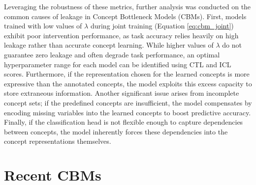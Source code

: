 Leveraging the robustness of these metrics, further analysis was conducted on the common causes of leakage in Concept Bottleneck Models (CBMs). First, models trained with low values of $\lambda$ during joint training (Equation \ref{eq:cbm_joint}) exhibit poor intervention performance, as task accuracy relies heavily on high leakage rather than accurate concept learning. While higher values of $\lambda$ do not guarantee zero leakage and often degrade task performance, an optimal hyperparameter range for each model can be identified using CTL and ICL scores. Furthermore, if the representation chosen for the learned concepts is more expressive than the annotated concepts, the model exploits this excess capacity to store extraneous information. Another significant issue arises from incomplete concept sets; if the predefined concepts are insufficient, the model compensates by encoding missing variables into the learned concepts to boost predictive accuracy. Finally, if the classification head is not flexible enough to capture dependencies between concepts, the model inherently forces these dependencies into the concept representations themselves.


\section{Recent CBMs}  

